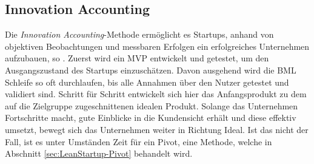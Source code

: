 \subsection*{\label{sec:LeanStartup-InnovationAccounting}\thesubsection\quad Innovation Accounting}
Die \textit{Innovation Accounting}-Methode ermöglicht es Startups, anhand von objektiven Beobachtungen und messbaren Erfolgen ein erfolgreiches Unternehmen aufzubauen, so \citeauthor{TheLeanStartup}. Zuerst wird ein \ac{MVP} entwickelt und getestet, um den Ausgangszustand des Startups einzuschätzen. Davon ausgehend wird die \ac{BML} Schleife so oft durchlaufen, bis alle Annahmen über den Nutzer getestet und validiert sind. Schritt für Schritt entwickelt sich hier das Anfangsprodukt zu dem auf die Zielgruppe zugeschnittenen idealen Produkt. Solange das Unternehmen Fortschritte macht, gute Einblicke in die Kundensicht erhält und diese effektiv umsetzt, bewegt sich das Unternehmen weiter in Richtung Ideal. Ist das nicht der Fall, ist es unter Umständen Zeit für ein Pivot, eine Methode, welche in Abschnitt \ref{sec:LeanStartup-Pivot} behandelt wird.

